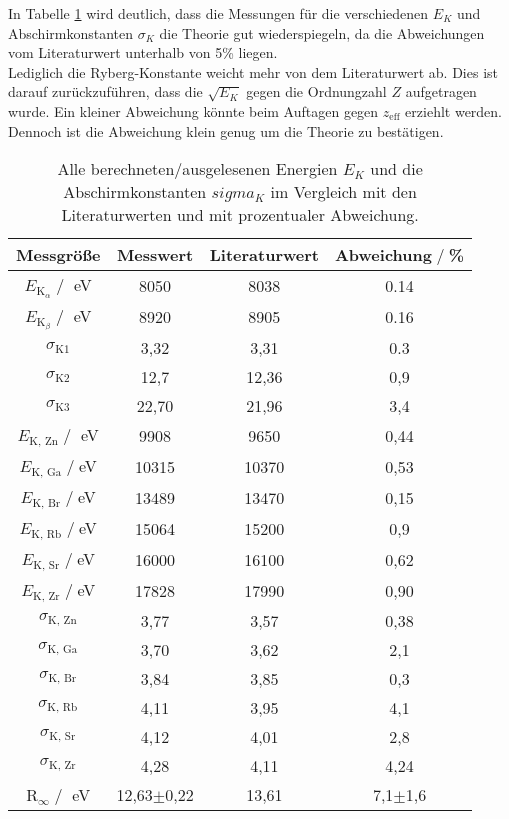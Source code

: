 In Tabelle \ref{tab:vergleich} wird deutlich, dass die Messungen für die verschiedenen
$E_K$ und Abschirmkonstanten $\sigma_K$ die Theorie gut wiederspiegeln, da die 
Abweichungen vom Literaturwert unterhalb von 5\% liegen.\\
Lediglich die Ryberg-Konstante weicht mehr von dem Literaturwert ab. Dies ist darauf zurückzuführen,
dass die $\sqrt{E_K}$ gegen die Ordnungzahl $Z$ aufgetragen wurde. Ein kleiner Abweichung
könnte beim Auftagen gegen $z_{\text{eff}}$ erziehlt werden.\\
Dennoch ist die Abweichung klein genug um die Theorie zu bestätigen.  
\begin{table}[H]
    \centering
    \begin{tabular}{c | c c c}
        \toprule
        {Messgröße} & {Messwert} & {Literaturwert}& Abweichung$\;/\;$\% \\
        \midrule
        $E_{\text{K}_{\alpha}}\;/\;$ eV & 8050 & 8038& 0.14  \\
        $E_{\text{K}_{\beta}}\;/\;$ eV  & 8920 & 8905& 0.16 \\
        $\sigma_{\text{K1}}$         & 3,32 & 3,31 &0.3   \\
        $\sigma_{\text{K2}}$         & 12,7& 12,36 & 0,9 \\
        $\sigma_{\text{K3}}$         & 22,70 & 21,96 & 3,4 \\
        \midrule
        $E_{\text{K, Zn}}\;/\;$ eV      & 9908  & 9650 & 0,44\\
        $E_{\text{K, Ga}}\;/\;$eV      & 10315  & 10370 & 0,53 \\
        $E_{\text{K, Br}}\;/\;$eV      & 13489 & 13470 & 0,15\\
        $E_{\text{K, Rb}}\;/\;$eV      & 15064 & 15200 & 0,9\\
        $E_{\text{K, Sr}}\;/\;$eV      & 16000 & 16100 & 0,62\\
        $E_{\text{K, Zr}}\;/\;$eV      & 17828 & 17990 & 0,90\\
        $\sigma_{\text{K, Zn}}$  & 3,77  & 3,57  & 0,38\\
        $\sigma_{\text{K, Ga}}$  & 3,70 & 3,62 & 2,1 \\
        $\sigma_{\text{K, Br}}$  & 3,84 & 3,85 & 0,3 \\
        $\sigma_{\text{K, Rb}}$  & 4,11  & 3,95 & 4,1  \\
        $\sigma_{\text{K, Sr}}$  & 4,12  & 4,01 & 2,8 \\
        $\sigma_{\text{K, Zr}}$  & 4,28  & 4,11 & 4,24 \\
        \midrule
        $\text{R}_{\infty}\;/\;$ eV & 12,63$\pm$0,22 & 13,61& 7,1$\pm$1,6 \\
        \bottomrule
    \end{tabular}
    \caption{Alle berechneten/ausgelesenen Energien $E_K$ und die Abschirmkonstanten $sigma_K$
    im Vergleich mit den Literaturwerten \cite{Absorptionskanten} und mit prozentualer Abweichung.}
    \label{tab:vergleich}
\end{table}